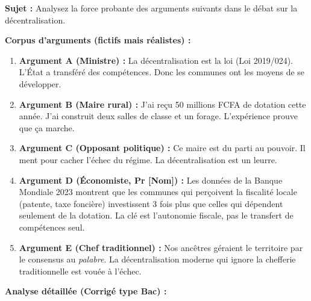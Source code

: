 \documentclass[11pt]{article}
\begin{document}
\begin{exoresolu}
\textbf{Sujet :} \guillemotleft Analysez la force probante des arguments suivants dans le débat sur la décentralisation. \guillemotright

\textbf{Corpus d'arguments (fictifs mais réalistes) :}
\begin{enumerate}
    \item \textbf{Argument A (Ministre) :} \guillemotleft La décentralisation est la loi (Loi 2019/024). L'État a transféré des compétences. Donc les communes ont les moyens de se développer. \guillemotright
    \item \textbf{Argument B (Maire rural) :} \guillemotleft J'ai reçu 50 millions FCFA de dotation cette année. J'ai construit deux salles de classe et un forage. L'expérience prouve que ça marche. \guillemotright
    \item \textbf{Argument C (Opposant politique) :} \guillemotleft Ce maire est du parti au pouvoir. Il ment pour cacher l'échec du régime. La décentralisation est un leurre. \guillemotright
    \item \textbf{Argument D (Économiste, Pr [Nom]) :} \guillemotleft Les données de la Banque Mondiale 2023 montrent que les communes qui perçoivent la fiscalité locale (patente, taxe foncière) investissent 3 fois plus que celles qui dépendent seulement de la dotation. La clé est l'autonomie fiscale, pas le transfert de compétences seul. \guillemotright
    \item \textbf{Argument E (Chef traditionnel) :} \guillemotleft Nos ancêtres géraient le territoire par le consensus au \emph{palabre}. La décentralisation moderne qui ignore la chefferie traditionnelle est vouée à l'échec. \guillemotright
\end{enumerate}

\textbf{Analyse détaillée (Corrigé type Bac) :}


\end{exoresolu}
\end{document}
